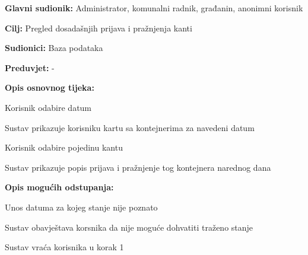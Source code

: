 				\noindent {}
					\begin{packed_item}
	
						\item \textbf{Glavni sudionik: }Administrator, komunalni radnik, građanin, anonimni korisnik
						\item  \textbf{Cilj:} Pregled dosadašnjih prijava i pražnjenja kanti
						\item  \textbf{Sudionici:} Baza podataka
						\item  \textbf{Preduvjet:} -
						\item  \textbf{Opis osnovnog tijeka:}
						
						\item[] \begin{packed_enum}
	
							\item Korisnik odabire datum
							\item Sustav prikazuje korisniku kartu sa kontejnerima za navedeni datum
							\item Korisnik odabire pojedinu kantu
							\item Sustav prikazuje popis prijava i pražnjenje tog kontejnera narednog dana
						\end{packed_enum}
						
						\item  \textbf{Opis mogućih odstupanja:}
						
						\item[] \begin{packed_item}
	
							\item[1.a] Unos datuma za kojeg stanje nije poznato
							
							\item[] \begin{packed_enum}
								
								\item Sustav obavještava korsnika da nije moguće dohvatiti traženo stanje
								\item Sustav vraća korisnika u korak 1
								
							\end{packed_enum}
							
							
						\end{packed_item}
					\end{packed_item}			
				\noindent {}
